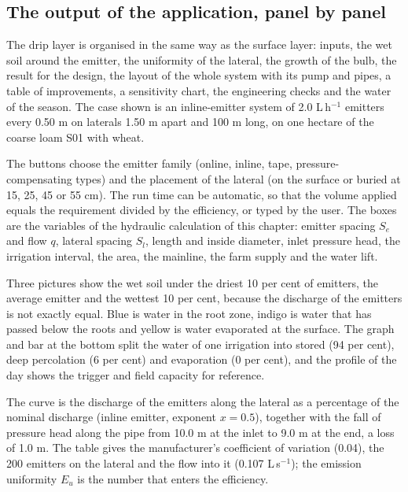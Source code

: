 \subsection{The output of the application, panel by panel}
The drip layer is organised in the same way as the surface layer: inputs, the wet soil around the emitter, the uniformity of the lateral, the growth of the bulb, the result for the design, the layout of the whole system with its pump and pipes, a table of improvements, a sensitivity chart, the engineering checks and the water of the season. The case shown is an inline-emitter system of 2.0 L\,h$^{-1}$ emitters every 0.50 m on laterals 1.50 m apart and 100 m long, on one hectare of the coarse loam S01 with wheat.

The buttons choose the emitter family (online, inline, tape, pressure-compensating types) and the placement of the lateral (on the surface or buried at 15, 25, 45 or 55 cm). The run time can be automatic, so that the volume applied equals the requirement divided by the efficiency, or typed by the user. The boxes are the variables of the hydraulic calculation of this chapter: emitter spacing $S_e$ and flow $q$, lateral spacing $S_l$, length and inside diameter, inlet pressure head, the irrigation interval, the area, the mainline, the farm supply and the water lift.


Three pictures show the wet soil under the driest 10 per cent of emitters, the average emitter and the wettest 10 per cent, because the discharge of the emitters is not exactly equal. Blue is water in the root zone, indigo is water that has passed below the roots and yellow is water evaporated at the surface. The graph and bar at the bottom split the water of one irrigation into stored (94 per cent), deep percolation (6 per cent) and evaporation (0 per cent), and the profile of the day shows the trigger and field capacity for reference.


The curve is the discharge of the emitters along the lateral as a percentage of the nominal discharge (inline emitter, exponent $x=0.5$), together with the fall of pressure head along the pipe from 10.0 m at the inlet to 9.0 m at the end, a loss of 1.0 m. The table gives the manufacturer's coefficient of variation (0.04), the 200 emitters on the lateral and the flow into it (0.107 L\,s$^{-1}$); the emission uniformity $E_u$ is the number that enters the efficiency.


